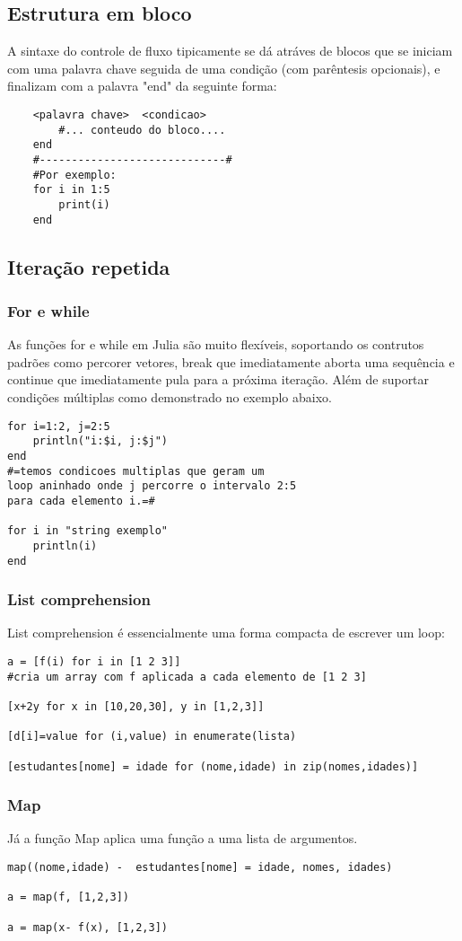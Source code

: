\subsection{Estrutura em bloco}
A sintaxe do controle de fluxo tipicamente se dá atráves de blocos que se iniciam com uma palavra chave seguida de uma condição (com parêntesis opcionais), e finalizam com a palavra "end" da seguinte forma: 
    \begin{lstlisting}
    <palavra chave>  <condicao> 
        #... conteudo do bloco....
    end 
    #-----------------------------#
    #Por exemplo:
    for i in 1:5
        print(i)
    end     
    \end{lstlisting}

\subsection{Iteração repetida}
\subsubsection{For e while}
As funções for e while em Julia são muito flexíveis, soportando os contrutos padrões como percorer vetores, break que imediatamente aborta uma sequência e continue que imediatamente pula para a próxima iteração. Além de suportar condições múltiplas como demonstrado no exemplo abaixo. 
\begin{lstlisting}
for i=1:2, j=2:5
	println("i:$i, j:$j")
end
#=temos condicoes multiplas que geram um 
loop aninhado onde j percorre o intervalo 2:5 
para cada elemento i.=#

for i in "string exemplo"
	println(i)
end 
\end{lstlisting}
\subsubsection{List comprehension}
List comprehension é essencialmente uma forma compacta de escrever um loop:
\begin{lstlisting}
a = [f(i) for i in [1 2 3]] 
#cria um array com f aplicada a cada elemento de [1 2 3]

[x+2y for x in [10,20,30], y in [1,2,3]]

[d[i]=value for (i,value) in enumerate(lista)

[estudantes[nome] = idade for (nome,idade) in zip(nomes,idades)]
\end{lstlisting}
\subsubsection{Map}
Já a função Map aplica uma função a uma lista de argumentos.
\begin{lstlisting}
map((nome,idade) -  estudantes[nome] = idade, nomes, idades)

a = map(f, [1,2,3]) 

a = map(x- f(x), [1,2,3])
\end{lstlisting}

